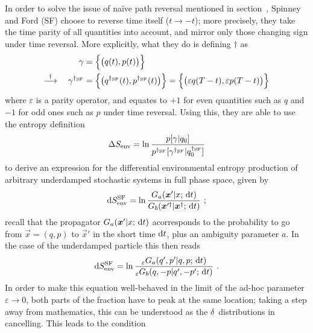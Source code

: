 In order to solve the issue of na\"ive path reversal mentioned in section~, Spinney and Ford (SF) \cite{sf} choose to reverse time itself (\(t\to-t\)); more precisely, they take the time parity of all quantities into account, and mirror only those changing sign under time reversal. More explicitly, what they do is defining \(\dagger\) as 
%
\begin{equation}\begin{split}
	\gamma &= \Bigl\{\bigl(q(t),p(t)\bigr)\Bigr\}
	\\ \overset\dagger\longrightarrow \quad
	\gamma^{\dagger_{\text{SF}}}
		&= \Bigl\{\bigl(q^{\dagger_{\text{SF}}}(t),p^{\dagger_{\text{SF}}}(t)\bigr)\Bigr\}
		= \Bigl\{\bigl(\varepsilon q(T-t),\varepsilon p(T-t)\bigr)\Bigr\}
\end{split}\end{equation}
%
where \(\varepsilon\) is a parity operator, and equates to \(+1\) for even quantities such as \(q\) and \(-1\) for odd ones such as \(p\) under time reversal. Using this, they are able to use the entropy definition
%
\begin{equation}
	\Delta S_\text{env} = \ln\frac{p[\gamma | q_0]}{p^{\dagger_{\text{SF}}}[\gamma^{\dagger_{\text{SF}}} | q_0^{\dagger_{\text{SF}}}]}
\end{equation}
%
to derive an expression for the differential environmental entropy production of arbitrary underdamped stochastic systems in full phase space,  given by
%
\begin{equation}
	\mathrm{d}S_\text{env}^{\text{SF}} = \ln \frac{G_a(\boldsymbol{x}'|x;\,\mathrm{d} t)}{G_b(\boldsymbol{x}'^\dagger|\boldsymbol{x}^\dagger;\,\mathrm{d} t)} ~;
\end{equation}
%
recall that the propagator \(G_a(\boldsymbol{x}'|x;\,\mathrm{d} t)\) acorresponds to the probability to go from \(\vec x = (q,p)\) to \(\vec x'\) in the short time \(\mathrm{d} t\), plus an ambiguity parameter \(a\). In the case of the underdamped particle  this then reads
%
\begin{equation}
	\label{eqn:DSEnv spinney main definition}
	\mathrm{d}S_\text{env}^{\text{SF}} =
		\ln \frac
			{_\varepsilon G_a(q',p'|q,p;\,\mathrm{d} t)}
			{_\varepsilon G_b(q,-p|q',-p';\,\mathrm{d} t)} ~.
\end{equation}
%
In order to make this equation well-behaved in the limit of the ad-hoc parameter \(\varepsilon\to0\), both parts of the fraction have to peak at the same location; taking a step away from mathematics, this can be understood as the \(\delta\)~distributions in  cancelling. This leads to the condition 
